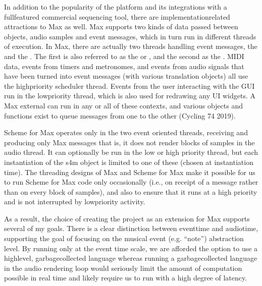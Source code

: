 \documentclass[letterpaper,10pt,english]{sphinxmanual}
\begin{document}
\sphinxAtStartPar
In addition to the popularity of the platform and its integrations with a full\sphinxhyphen{}featured commercial sequencing tool,
there are implementation\sphinxhyphen{}related attractions to Max as well.
Max supports two kinds of data passed between objects, audio samples and event messages, which in turn run in
different threads of execution.
In Max, there are actually two threads handling event messages, the  and the .
The first is also referred to as the  or , and the second as the .
MIDI data, events from timers and metronomes, and events from audio signals that have been turned into event messages
(with various translation objects) all use the high\sphinxhyphen{}priority scheduler thread.
Events from the user interacting with the GUI run in the low\sphinxhyphen{}priority thread, which is also used for redrawing any UI widgets.
A Max external can run in any or all of these contexts, and various objects and functions exist to queue messages from one to the other
(Cycling 74 2019).

\sphinxAtStartPar
Scheme for Max operates only in the two event oriented threads, receiving and producing only Max messages \sphinxhyphen{}
that is, it does not render blocks of samples in the audio thread.
It can optionally be run in  the low or high priority thread, but each instantiation of the s4m object
is limited to one of these (chosen at instantiation time).
The threading designs of Max and Scheme for Max make it possible for us to run Scheme for Max code only occasionally
(i.e., on receipt of a message rather than on every block of samples), and also to ensure that it runs at a high priority
and is not interrupted by low\sphinxhyphen{}priority activity.

\sphinxAtStartPar
As a result, the choice of creating the project as an extension for Max supports several of my goals.
There is a clear distinction between event\sphinxhyphen{}time and audio\sphinxhyphen{}time, supporting the goal of focusing on
the musical event (e.g. “note”) abstraction level.
By running only at the event time scale, we are afforded the option to use a high\sphinxhyphen{}level, garbage\sphinxhyphen{}collected language \sphinxhyphen{}
whereas running a garbage\sphinxhyphen{}collected language in the audio rendering loop would seriously limit the amount of
computation possible in real time and likely require us to run with a high degree of latency.
\end{document}
